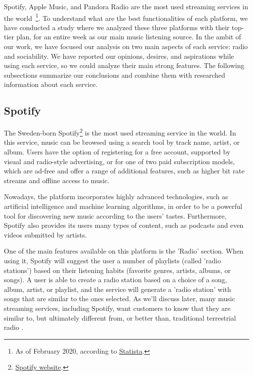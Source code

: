 Spotify, Apple Music, and Pandora Radio are the most used streaming services in the world~\footnote{As of February 2020, according to  \href{http://www.statista.com/chart/20826/music-streaming-services-with-most-subscribers-global-fipp/}{Statista}.}. To understand what are the best functionalities of each platform, we have conducted a study where we analyzed these three platforms with their top-tier plan, for an entire week as our main music listening source. In the ambit of our work, we have focused our analysis on two main aspects of each service: radio and sociability. We have reported our opinions, desires, and aspirations while using each service, so we could analyze their main strong features. The following subsections summarize our conclusions and combine them with researched information about each service.

\subsection{Spotify}
The Sweden-born Spotify\footnote{\href{https://www.spotify.com/}{Spotify website}.} is the most used streaming service in the world. In this service, music can be browsed using a search tool by track name, artist, or album. Users have the option of registering for a free account, supported by visual and radio-style advertising, or for one of two paid subscription models, which are ad-free and offer a range of additional features, such as higher bit rate streams and offline access to music. ~\cite{Swanson2013}

Nowadays, the platform incorporates highly advanced technologies, such as artificial intelligence and machine learning algorithms, in order to be a powerful tool for discovering new music according to the users' tastes. Furthermore, Spotify also provides its users many types of content, such as podcasts and even videos submitted by artists.

One of the main features available on this platform is the 'Radio' section. When using it, Spotify will suggest the user a number of playlists (called 'radio stations') based on their listening habits (favorite genres, artists, albums, or songs). A user is able to create a radio station based on a choice of a song, album, artist, or playlist, and the service will generate a 'radio station' with songs that are similar to the ones selected. As we'll discuss later, many music streaming services, including Spotify, want customers to know that they are similar to, but ultimately different from, or better than, traditional terrestrial radio \cite{Glantz2016}.


